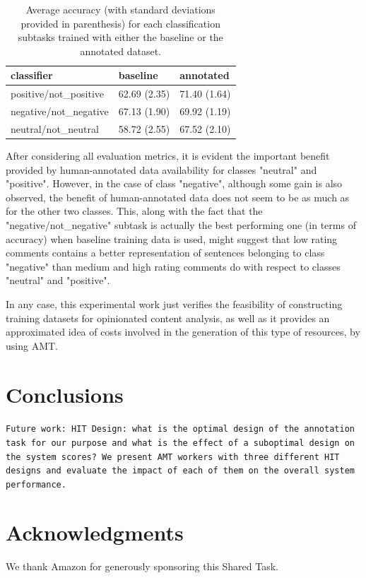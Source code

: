 \documentclass[11pt,letterpaper]{article}
\begin{document}
\begin{table}
\begin{tabular}{|l|l|l|}
\hline
classifier &baseline &annotated \\ 
\hline
positive/not\_positive &62.69 (2.35) &71.40 (1.64) \\ 
\hline
negative/not\_negative &67.13 (1.90) &69.92 (1.19) \\ 
\hline
neutral/not\_neutral &58.72 (2.55) &67.52 (2.10) \\ 
\hline
\end{tabular}
\caption{Average accuracy (with standard deviations provided in parenthesis) 
for each classification subtasks trained with either the baseline or the annotated dataset.}
\label{tc_accu}
\end{table}

After considering all evaluation metrics, it is evident the important benefit provided by human-annotated data 
availability for classes "neutral" and "positive". However, in the case of class "negative", although some 
gain is also observed, the benefit of human-annotated data does not seem to be as much as for the other two 
classes. This, along with the fact that the "negative/not\_negative" subtask is actually the best performing
one (in terms of accuracy) when baseline training data is used, might suggest that low rating comments contains 
a better representation of sentences belonging to class "negative" than medium and high rating comments do with
respect to classes "neutral" and "positive". 

In any case, this experimental work just verifies the feasibility of constructing training datasets for
opinionated content analysis, as well as it provides an approximated idea of costs involved in the generation
of this type of resources, by using AMT.

\section{Conclusions}
\label{sect:conclusions}
\texttt{Future work: HIT Design: what is the optimal design of the annotation task for our purpose and what is the effect of a suboptimal design on the system scores? We present AMT workers with three different HIT designs and evaluate the impact of each of them on the overall system performance.}

\section*{Acknowledgments}
We thank Amazon for generously sponsoring this Shared Task.



\end{document}
